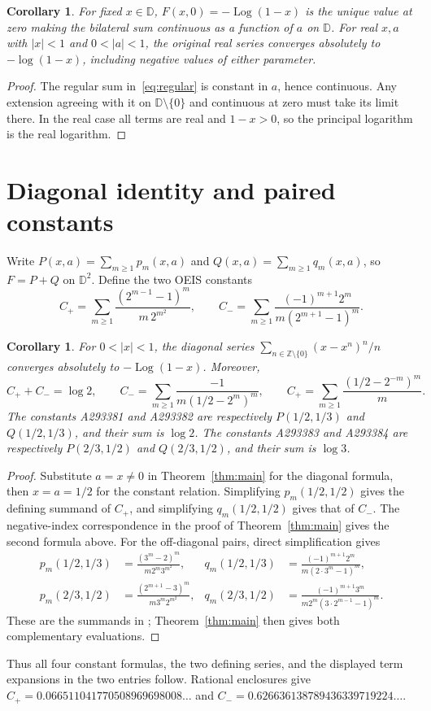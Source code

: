 \documentclass[11pt]{article}
\newtheorem{corollary}[theorem]{Corollary}
\DeclareMathOperator{\Log}{Log}
\begin{document}
\begin{corollary}\label{cor:extension}
For fixed $x\in\mathbb D$, $F(x,0)=-\Log(1-x)$ is the unique value
at zero making the bilateral sum continuous as a function of $a$ on
$\mathbb D$. For real $x,a$ with $|x|<1$ and $0<|a|<1$, the original
real series converges absolutely to $-\log(1-x)$, including negative
values of either parameter.
\end{corollary}
\begin{proof}
The regular sum in~\eqref{eq:regular} is constant in $a$, hence continuous.
Any extension agreeing with it on $\mathbb D\setminus\{0\}$ and continuous
at zero must take its limit there. In the real case all terms are real
and $1-x>0$, so the principal logarithm is the real logarithm.
\end{proof}

\section{Diagonal identity and paired constants}
Write $P(x,a)=\sum_{m\geq1}p_m(x,a)$ and
$Q(x,a)=\sum_{m\geq1}q_m(x,a)$, so $F=P+Q$ on $\mathbb D^2$.
Define the two OEIS constants
\[
 C_+=\sum_{m\geq1}\frac{(2^{m-1}-1)^m}{m\,2^{m^2}},\qquad
 C_-=\sum_{m\geq1}\frac{(-1)^{m+1}2^m}{m(2^{m+1}-1)^m}.
\]
\begin{corollary}\label{cor:constants}
For $0<|x|<1$, the diagonal series
$\sum_{n\in\mathbb Z\setminus\{0\}}(x-x^n)^n/n$ converges absolutely
to $-\Log(1-x)$. Moreover,
\[
 C_++C_-=\log2,\qquad
 C_-=\sum_{m\geq1}\frac{-1}{m(1/2-2^m)^m},\qquad
 C_+=\sum_{m\geq1}\frac{(1/2-2^{-m})^m}{m}.
\]
The constants A293381 and A293382 are respectively
$P(1/2,1/3)$ and $Q(1/2,1/3)$, and their sum is $\log2$.
The constants A293383 and A293384 are respectively
$P(2/3,1/2)$ and $Q(2/3,1/2)$, and their sum is $\log3$.
\end{corollary}
\begin{proof}
Substitute $a=x\ne0$ in Theorem~\ref{thm:main} for the diagonal formula,
then $x=a=1/2$ for the constant relation. Simplifying
$p_m(1/2,1/2)$ gives the defining summand of $C_+$, and simplifying
$q_m(1/2,1/2)$ gives that of $C_-$. The negative-index correspondence
in the proof of Theorem~\ref{thm:main} gives the second formula above.
For the off-diagonal pairs, direct simplification gives
\begin{align*}
 p_m(1/2,1/3)&=\frac{(3^m-2)^m}{m2^m3^{m^2}},&
 q_m(1/2,1/3)&=\frac{(-1)^{m+1}2^m}{m(2\cdot3^m-1)^m},\\
 p_m(2/3,1/2)&=\frac{(2^{m+1}-3)^m}{m3^m2^{m^2}},&
 q_m(2/3,1/2)&=\frac{(-1)^{m+1}3^m}{m2^m(3\cdot2^{m-1}-1)^m}.
\end{align*}
These are the summands in \cite{hanna12,hanna34}; Theorem~\ref{thm:main}
then gives both complementary evaluations.
\end{proof}
Thus all four constant formulas, the two defining series, and the
displayed term expansions in the two entries follow. Rational enclosures
give $C_+=0.066511041770508969698008\ldots$ and
$C_-=0.626636138789436339719224\ldots$.
\end{document}
